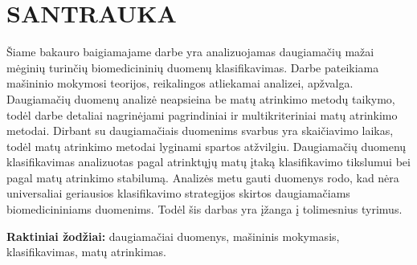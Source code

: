 \section*{SANTRAUKA}
\label{santrauka}

Šiame bakauro baigiamajame darbe yra analizuojamas daugiamačių mažai mėginių turinčių biomedicininių duomenų klasifikavimas. Darbe pateikiama mašininio mokymosi teorijos, reikalingos atliekamai analizei, apžvalga. Daugiamačių duomenų analizė neapsieina be matų atrinkimo metodų taikymo, todėl darbe detaliai nagrinėjami pagrindiniai ir multikriteriniai matų atrinkimo metodai. Dirbant su daugiamačiais duomenims svarbus yra skaičiavimo laikas, todėl matų atrinkimo metodai lyginami spartos atžvilgiu. Daugiamačių duomenų klasifikavimas analizuotas pagal atrinktųjų matų įtaką klasifikavimo tikslumui bei pagal matų atrinkimo stabilumą. Analizės metu gauti duomenys rodo, kad nėra universaliai geriausios klasifikavimo strategijos skirtos daugiamačiams biomedicininiams duomenims. Todėl šis darbas yra įžanga į tolimesnius tyrimus.

\textbf{Raktiniai žodžiai:} daugiamačiai duomenys, mašininis mokymasis, klasifikavimas, matų atrinkimas. 